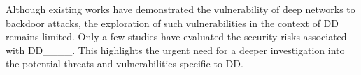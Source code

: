 Although existing works have demonstrated the vulnerability of deep networks to backdoor attacks, the exploration of such vulnerabilities in the context of DD remains limited. Only a few studies have evaluated the security risks associated with DD____. This highlights the urgent need for a deeper investigation into the potential threats and vulnerabilities specific to DD. 

%